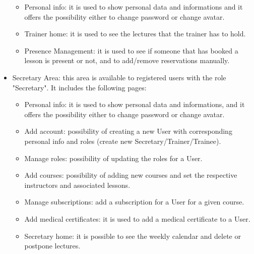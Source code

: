 \begin{itemize}
\begin{itemize}
		\item Personal info: it is used to show personal data and informations and it offers the possibility either to change password or change avatar.
		\item Trainer home: it is used to see the lectures that the trainer has to hold.
		\item Presence Management: it is used to see if someone that has booked a lesson is present or not, and to add/remove reservations manually.
	\end{itemize}
	\item Secretary Area: this area is available to registered users with the role "Secretary".
	It includes the following pages:
	\begin{itemize}
		\item Personal info: it is used to show personal data and informations, and it offers the possibility either to change password or change avatar.
		\item Add account: possibility of creating a new User with corresponding personal info and roles (create new Secretary/Trainer/Trainee).
		\item Manage roles: possibility of updating the roles for a User.
		\item Add courses: possibility of adding new courses and set the respective instructors and associated lessons.
		\item Manage subscriptions: add a subscription for a User for a given course.
		\item Add medical certificates: it is used to add a medical certificate to a User.
		\item Secretary home: it is possible to see the weekly calendar and delete or postpone lectures.
	\end{itemize}
\end{itemize}
